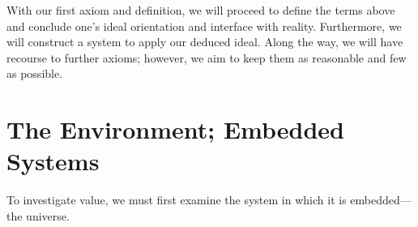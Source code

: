 \documentclass[11pt]{diazessay} %
\numberwithin{equation}{section}
\begin{document}
With our first axiom and definition, we will proceed to define 
the terms above and conclude one's ideal orientation and interface with reality. Furthermore, we will construct a system to apply our deduced ideal. Along the way, we will have recourse to further axioms; however, we aim to keep them as reasonable and few as possible.

\section*{The Environment; Embedded Systems}

To investigate value, we must first examine the system in which it is embedded---the universe. 




\end{document}
